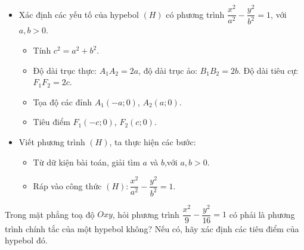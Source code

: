 \begin{dang}
		\begin{itemize}
		\item Xác định các yếu tố của hypebol $(H)$ có phương trình $\dfrac{x^2}{a^2}-\dfrac{y^2}{b^2}=1$, với $a,b>0$.
		\begin{itemize}
			\item Tính $c^2 = a^2 + b^2$.
			\item Độ dài trục thực: $A_1 A_2 = 2a$, độ dài trục ảo: $B_1 B_2 = 2b$. Độ dài tiêu cự: $F_1 F_2 = 2c$.
			\item Tọa độ các đỉnh $A_1(-a;0)$, $A_2(a;0)$.
			\item Tiêu điểm $F_1(-c;0)$,  $F_2(c;0)$.
		\end{itemize}
		\item Viết phương trình $(H)$, ta thực hiện các bước:
		\begin{itemize}
			\item Từ dữ kiện bài toán, giải tìm $a$ và $b$,với $a, b>0$. 
			\item Ráp vào công thức $(H): \dfrac{x^{2}}{a^{2}}-\dfrac{y^{2}}{b^{2}}=1$.
		\end{itemize}
	\end{itemize}
\end{dang}
\begin{vd}%
	Trong mặt phẳng toạ độ $Oxy$, hỏi phương trình $\dfrac{x^2}{9}-\dfrac{y^2}{16}=1$ có phải là phương trình chính tắc của một hypebol không? Nếu có, hãy xác định các tiêu điểm của hypebol đó.
\end{vd}
